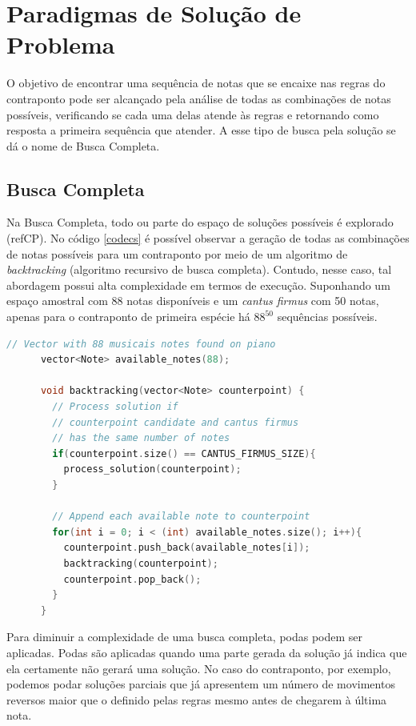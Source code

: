  \section[Paradigmas de Solução de Problema]{Paradigmas de Solução de Problema}

    O objetivo de encontrar uma sequência de notas que se encaixe nas regras do contraponto pode ser alcançado pela análise de todas as combinações de notas possíveis, verificando se cada uma delas atende às regras e retornando como resposta a primeira sequência que atender. A esse tipo de busca pela solução se dá o nome de Busca Completa.

    \subsection[Busca Completa]{Busca Completa}

      Na Busca Completa, todo ou parte do espaço de soluções possíveis é explorado (refCP). No código \ref{codecs} é possível observar a geração de todas as combinações de notas possíveis para um contraponto por meio de um algoritmo de \textit{backtracking} (algoritmo recursivo de busca completa). Contudo, nesse caso, tal abordagem possui alta complexidade em termos de execução. Suponhando um espaço amostral com 88 notas disponíveis e um \textit{cantus firmus} com 50 notas, apenas para o contraponto de primeira espécie há $88^{50}$ sequências possíveis.

      \begin{lstlisting}[language={C}, caption={Busca Completa}, label={codecs}]
      // Vector with 88 musicais notes found on piano
      vector<Note> available_notes(88);

      void backtracking(vector<Note> counterpoint) {
        // Process solution if
        // counterpoint candidate and cantus firmus
        // has the same number of notes
        if(counterpoint.size() == CANTUS_FIRMUS_SIZE){
          process_solution(counterpoint);
        }

        // Append each available note to counterpoint
        for(int i = 0; i < (int) available_notes.size(); i++){
          counterpoint.push_back(available_notes[i]);
          backtracking(counterpoint);
          counterpoint.pop_back();
        }
      }
      \end{lstlisting}

      Para diminuir a complexidade de uma busca completa, podas podem ser aplicadas. Podas são aplicadas quando uma parte gerada da solução já indica que ela certamente não gerará uma solução. No caso do contraponto, por exemplo, podemos podar soluções parciais que já apresentem um número de movimentos reversos maior que o definido pelas regras mesmo antes de chegarem à última nota.

